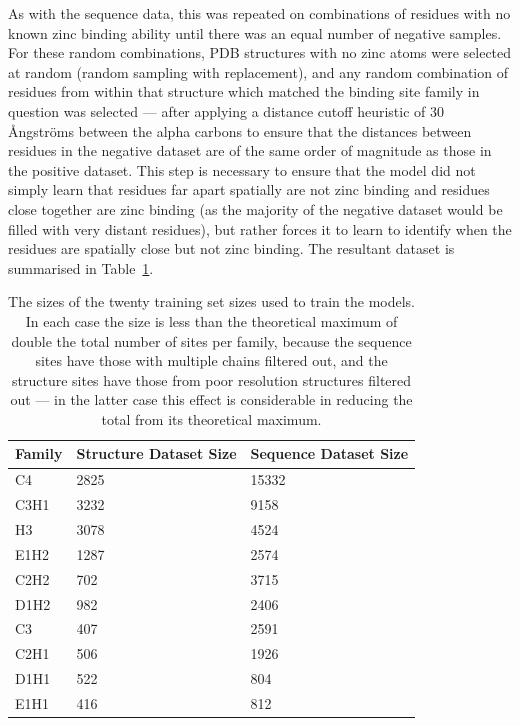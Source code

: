 As with the sequence data, this was repeated on combinations of residues with no known zinc binding ability until there was an equal number of negative samples. For these random combinations, PDB structures with no zinc atoms were selected at random (random sampling with replacement), and any random combination of residues from within that structure which matched the binding site family in question was selected --- after applying a distance cutoff heuristic of 30 {\AA}ngstr\"{o}ms between the alpha carbons to ensure that the distances between residues in the negative dataset are of the same order of magnitude as those in the positive dataset. This step is necessary to ensure that the model did not simply learn that residues far apart spatially are not zinc binding and residues close together are zinc binding (as the majority of the negative dataset would be filled with very distant residues), but rather forces it to learn to identify when the residues are spatially close but not zinc binding. The resultant dataset is summarised in Table~\ref{tab:dataset-size}.

\begin{table}
  \caption[Training set size.]{\label{tab:dataset-size}The sizes of the twenty training set sizes used to train the models. In each case the size is less than the theoretical maximum of double the total number of sites per family, because the sequence sites have those with multiple chains filtered out, and the structure sites have those from poor resolution structures filtered out --- in the latter case this effect is considerable in reducing the total from its theoretical maximum.}
\begin{center}
\begin{tabular}{lll} \hline
Family & Structure Dataset Size & Sequence Dataset Size \\ \hline
C4     & 2825         &  15332  \\
C3H1   & 3232         &  9158   \\
H3     & 3078         &  4524   \\
E1H2   & 1287         &  2574   \\
C2H2   &  702         &  3715   \\
D1H2   &  982         &  2406   \\
C3     &  407         &  2591   \\
C2H1   &  506         &  1926   \\
D1H1   &  522         &  804    \\ 
E1H1   &  416         &  812    \\ \hline
\end{tabular}
\end{center}
\end{table}

